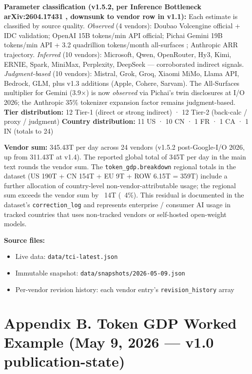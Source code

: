 \documentclass[11pt,a4paper]{article}
\begin{document}
\textbf{Parameter classification (v1.5.2, per Inference Bottleneck arXiv:2604.17431 \cite{inference2026bottleneck}, downsunk to vendor row in v1.1):} Each estimate is classified by source quality. \emph{Observed} (4 vendors): Doubao Volcengine official + IDC validation; OpenAI 15B tokens/min API official; Pichai Gemini 19B tokens/min API + 3.2 quadrillion tokens/month all-surfaces \cite{pichai2026io}; Anthropic ARR trajectory. \emph{Inferred} (10 vendors): Microsoft, Qwen, OpenRouter, Hy3, Kimi, ERNIE, Spark, MiniMax, Perplexity, DeepSeek --- corroborated indirect signals. \emph{Judgment-based} (10 vendors): Mistral, Grok, Groq, Xiaomi MiMo, Llama API, Bedrock, GLM, plus v1.3 additions (Apple, Cohere, Sarvam). The All-Surfaces multiplier for Gemini (3.9×) is now \emph{observed} via Pichai's twin disclosures at I/O 2026; the Anthropic 35\% tokenizer expansion factor remains judgment-based.
\textbf{Tier distribution:} 12 Tier-1 (direct or strong indirect) · 12 Tier-2 (back-calc / proxy / judgment)
\textbf{Country distribution:} 11 US · 10 CN · 1 FR · 1 CA · 1 IN (totals to 24)

\textbf{Vendor sum:} 345.43T per day across 24 vendors (v1.5.2 post-Google-I/O 2026, up from 311.43T at v1.4). The reported global total of 345T per day in the main text rounds the vendor sum. The \texttt{token\_gdp.breakdown} regional totals in the dataset (US 190T + CN 154T + EU 9T + ROW 6.15T = 359T) include a further allocation of country-level non-vendor-attributable usage; the regional sum exceeds the vendor sum by ~14T (~4\%). This residual is documented in the dataset's \texttt{correction\_log} and represents enterprise / consumer AI usage in tracked countries that uses non-tracked vendors or self-hosted open-weight models.

\textbf{Source files:}
\begin{itemize}
  \item Live data: \texttt{data/tci-latest.json}
  \item Immutable snapshot: \texttt{data/snapshots/2026-05-09.json}
  \item Per-vendor revision history: each vendor entry's \texttt{revision\_history} array
\end{itemize}


\section{Appendix B. Token GDP Worked Example (May 9, 2026 --- v1.0 publication-state)}
\end{document}
